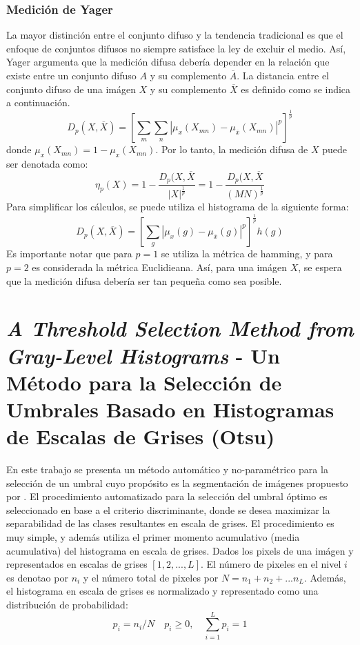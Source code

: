 \documentclass[preprint,12pt]{elsarticle}
\begin{document}
\subsubsection{Medición de Yager}
La mayor distinción entre el conjunto difuso y la tendencia tradicional es que el enfoque de conjuntos difusos no siempre satisface la ley de excluir el medio.
%
Así, Yager argumenta que la medición difusa debería depender en la relación que existe entre un conjunto difuso $A$ y su complemento $\overline{A}$.
%
La distancia entre el conjunto difuso de una imágen $X$ y su complemento $\overline{X}$ es definido como se indica a continuación.
\begin{equation}
    D_p(X, \overline{X}) = \left [  \sum_m \sum_n |\mu_x(X_{mn}) - \mu_{\overline{x}}(X_{mn})|^p  \right ] ^{\frac{1}{p}}
\end{equation}
donde $\mu_x(X_{mn}) = 1-\mu_x(X_{mn})$. 
%
Por lo tanto, la medición difusa de $X$ puede ser denotada como:
\begin{equation}
    \eta_p(X) = 1 - \frac{D_p(X,\overline{X}}{|X|^{\frac{1}{p}}} = 1 - \frac{D_p(X,\overline{X}}{(MN)^{\frac{1}{p}}}
\end{equation}
Para simplificar los cálculos, se puede utiliza el histograma de la siguiente forma:
\begin{equation}
    D_p(X, \overline{X}) = \left [ \sum_g | \mu_x(g) - \mu_{\overline{x}}(g) |^p \right ] ^{\frac{1}{p}} h(g)
\end{equation}
Es importante notar que para $p=1$ se utiliza la métrica de hamming, y para $p=2$ es considerada la métrica Euclidieana.
%
Así, para una imágen $X$, se espera que la medición difusa debería ser tan pequeña como sea posible.
%


\section{\textit{A Threshold Selection Method from Gray-Level Histograms} - Un Método para la Selección de Umbrales Basado en Histogramas de Escalas de Grises (Otsu)}

En este trabajo se presenta un método automático y no-paramétrico para la selección de un umbral cuyo propósito es la segmentación de imágenes propuesto por \citet{otsu1979threshold}.
%
El procedimiento automatizado para la selección del umbral óptimo es seleccionado en base a el criterio discriminante, donde se desea maximizar la separabilidad de las clases resultantes en escala de grises.
%
El procedimiento es muy simple, y además utiliza el primer momento acumulativo (media acumulativa) del histograma en escala de grises.
%
Dados los pixels de una imágen y representados en escalas de grises $[1,2,...,L]$.
%
El número de pixeles en el nivel $i$ es denotao por $n_i$ y el número total de pixeles por $N=n_1+n_2+...n_L$.
%
Además, el histograma en escala de grises es normalizado y representado como una distribución de probabilidad:
\begin{equation}
    p_i = n_i/N \quad p_i \geq 0, \quad \sum_{i=1}^L p_i=1
\end{equation}
\end{document}
